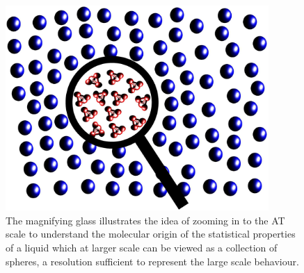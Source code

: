 \documentclass[aps,prb,preprint,citeautoscript]{revtex4}
\begin{document}
\begin{figure}
  \centering
  \includegraphics[angle=0,width=10cm]{zoom.eps}
  \caption{The magnifying glass illustrates the idea of zooming in to the AT scale to understand the molecular origin of the statistical properties of a liquid which at larger scale can be viewed as a collection of spheres, a resolution sufficient to represent the large scale behaviour.}
  \label{zoom}
\end{figure} 
\end{document}

